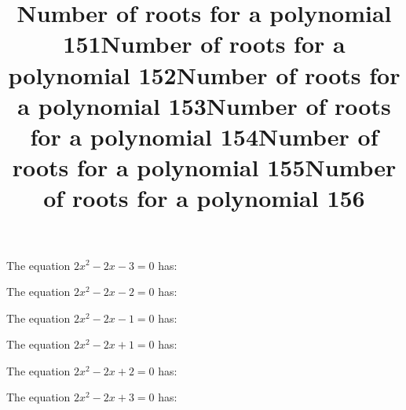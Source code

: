 \documentclass{article}
\begin{document}
\begin{category}
\begin{question}[multichoice]


\end{question}
\begin{question}[multichoice]
\title{Number of roots for a polynomial 151}
The equation $2 x^{2} - 2 x - 3=0$ has:



\end{question}
\begin{question}[multichoice]
\title{Number of roots for a polynomial 152}
The equation $2 x^{2} - 2 x - 2=0$ has:



\end{question}
\begin{question}[multichoice]
\title{Number of roots for a polynomial 153}
The equation $2 x^{2} - 2 x - 1=0$ has:



\end{question}
\begin{question}[multichoice]
\title{Number of roots for a polynomial 154}
The equation $2 x^{2} - 2 x + 1=0$ has:



\end{question}
\begin{question}[multichoice]
\title{Number of roots for a polynomial 155}
The equation $2 x^{2} - 2 x + 2=0$ has:



\end{question}
\begin{question}[multichoice]
\title{Number of roots for a polynomial 156}
The equation $2 x^{2} - 2 x + 3=0$ has:




\end{question}
\end{category}
\end{document}
